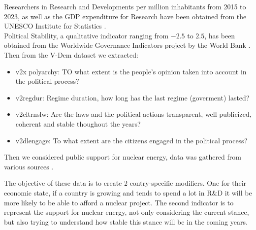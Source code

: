 Researchers in Research and Developments per million inhabitants from 2015 to 2023, as well as the GDP expenditure for Research have been obtained from the UNESCO Institute for Statistics \cite{PLACEHOLDER}. \\
Political Stability, a qualitative indicator ranging from $-2.5$ to $2.5$, has been obtained from the Worldwide Governance Indicators project by the World Bank \cite{PLACEHOLDER}. \\
Then from the V-Dem dataset \cite{PLACEHOLDER} we extracted:
\begin{itemize}
    \item v2x polyarchy: TO what extent is the people's opinion taken into account in the political process?
    \item v2regdur: Regime duration, how long has the last regime (goverment) lasted?
    \item v2cltrnslw: Are the laws and the political actions transparent, well publicized, coherent and stable thoughout the years?
    \item v2dlengage: To what extent are the citizens engaged in the political process?
\end{itemize}

Then we considered public support for nuclear energy, data was gathered from various sources \cite{PLACEHOLDER} \cite{PLACEHOLDER} \cite{PLACEHOLDER} \cite{PLACEHOLDER}.

The objective of these data is to create 2 contry-specific modifiers. One for their economic state, if a country is growing and tends to spend a lot in R\&D it will be more likely to be able to afford a nuclear project. The second indicator is to represent the support for nuclear energy, not only considering the current stance, but also trying to understand how stable this stance will be in the coming years.


